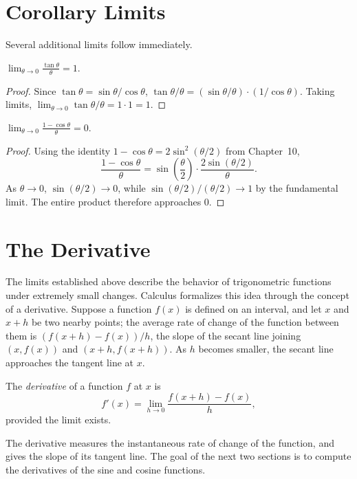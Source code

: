 \section{Corollary Limits}

Several additional limits follow immediately.

\begin{theorem}
$\displaystyle\lim_{\theta\to0} \frac{\tan\theta}{\theta} = 1$.
\end{theorem}

\begin{proof}
Since $\tan\theta = \sin\theta/\cos\theta$, $\tan\theta/\theta =
(\sin\theta/\theta)\cdot(1/\cos\theta)$. Taking limits, $\lim_{\theta\to0}
\tan\theta/\theta = 1\cdot1 = 1$.
\end{proof}

\begin{theorem}
$\displaystyle\lim_{\theta\to0} \frac{1-\cos\theta}{\theta} = 0$.
\end{theorem}

\begin{proof}
Using the identity $1-\cos\theta = 2\sin^2(\theta/2)$ from Chapter~10,
\[
\frac{1-\cos\theta}{\theta} = \sin\left(\frac{\theta}{2}\right)\cdot
\frac{2\sin(\theta/2)}{\theta}.
\]
As $\theta \to 0$, $\sin(\theta/2) \to 0$, while
$\sin(\theta/2)/(\theta/2) \to 1$ by the fundamental limit. The entire
product therefore approaches $0$.
\end{proof}

\section{The Derivative}

The limits established above describe the behavior of trigonometric
functions under extremely small changes. Calculus formalizes this idea
through the concept of a derivative. Suppose a function $f(x)$ is
defined on an interval, and let $x$ and $x+h$ be two nearby points; the
average rate of change of the function between them is
$(f(x+h)-f(x))/h$, the slope of the secant line joining $(x,f(x))$ and
$(x+h,f(x+h))$. As $h$ becomes smaller, the secant line approaches the
tangent line at $x$.

\begin{definition}
The \emph{derivative} of a function $f$ at $x$ is
\[
f'(x) = \lim_{h\to0} \frac{f(x+h)-f(x)}{h},
\]
provided the limit exists.
\end{definition}

The derivative measures the instantaneous rate of change of the
function, and gives the slope of its tangent line. The goal of the next
two sections is to compute the derivatives of the sine and cosine
functions.

